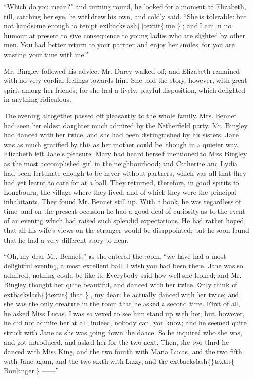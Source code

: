 \documentclass[10pt]{book}
\begin{document}
   “Which do you mean?” and turning round, he looked for a moment at
Elizabeth, till, catching her eye, he withdrew his own, and coldly said,
“She is tolerable: but not handsome enough to tempt
   	extbackslash\{\}textit\{
    me
   \}
   ; and I am in no
humour at present to give consequence to young ladies who are slighted
by other men. You had better return to your
   partner and enjoy her
smiles, for you are wasting your time with me.”
  

   Mr. Bingley followed his advice. Mr. Darcy walked off; and Elizabeth
remained with no very cordial feelings towards him. She told the story,
however, with great spirit among her friends; for she had a lively,
playful disposition, which delighted in anything ridiculous.
  

   The evening altogether passed off pleasantly to the whole family. Mrs.
Bennet had seen her eldest daughter much admired by the Netherfield
party. Mr. Bingley had danced with her twice, and she had been
distinguished by his sisters. Jane was as much gratified by this as her
mother could be, though in a quieter way. Elizabeth felt Jane’s
pleasure. Mary had heard herself mentioned to Miss Bingley as the most
accomplished girl in the neighbourhood; and Catherine and Lydia had been
fortunate enough to be never without partners, which was all that they
had yet learnt to care for at a ball. They returned, therefore, in good
spirits to Longbourn, the village where they lived, and of which they
were the principal inhabitants. They found Mr. Bennet still up. With a
book, he was regardless of time; and on the present occasion he had a
good deal of curiosity as to the event of an evening which had raised
such splendid expectations. He had rather hoped that all his wife’s
views on the stranger would be disappointed; but he soon found that he
had a very different story to hear.
  

   “Oh, my dear Mr. Bennet,” as she entered the room, “we have had a most
delightful evening, a most excellent ball. I wish you had been there.
Jane was so admired, nothing could be like it. Everybody said how well
she looked; and Mr. Bingley thought her quite beautiful, and danced with
her twice. Only think of
   	extbackslash\{\}textit\{
    that
   \}
   , my dear: he
   actually danced with her
twice; and she was the only creature in the room that he asked a second
time. First of all, he asked Miss Lucas. I was so vexed to see him stand
up with her; but, however, he did not admire her at all; indeed, nobody
can, you know; and he seemed quite struck with Jane as she was going
down the dance. So he inquired who she was, and got introduced, and
asked her for the two next. Then, the two third he danced with Miss
King, and the two fourth with Maria Lucas, and the two fifth with Jane
again, and the two sixth with Lizzy, and the
   	extbackslash\{\}textit\{
    Boulanger
   \}
   ——”
  
\end{document}
